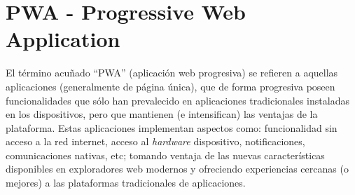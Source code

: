 \section{PWA - Progressive Web Application}

El término acuñado ``PWA'' (aplicación web progresiva) se refieren a aquellas aplicaciones (generalmente de página única), que de forma progresiva poseen funcionalidades que sólo han prevalecido en aplicaciones tradicionales instaladas en los dispositivos, pero que mantienen (e intensifican) las ventajas de la plataforma. Estas aplicaciones implementan aspectos como: funcionalidad sin acceso a la red internet, acceso al \textit{hardware} dispositivo, notificaciones, comunicaciones nativas, etc; tomando ventaja de las nuevas características disponibles en exploradores web modernos y ofreciendo experiencias cercanas (o mejores) a las plataformas tradicionales de aplicaciones.
